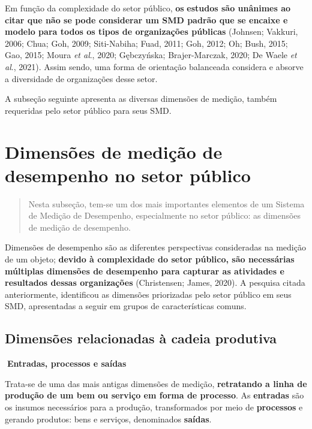 \documentclass[
  letterpaper,
  DIV=11,
  numbers=noendperiod]{scrreprt}
\begin{document}
Em função da complexidade do setor público, \textbf{os} \textbf{estudos
são unânimes ao citar que não se pode considerar um SMD padrão que se
encaixe e modelo para todos os tipos de organizações públicas} (Johnsen;
Vakkuri, 2006; Chua; Goh, 2009; Siti-Nabiha; Fuad, 2011; Goh, 2012; Oh;
Bush, 2015; Gao, 2015; Moura \emph{et al}., 2020; Gębczyńska;
Brajer-Marczak, 2020; De Waele \emph{et al}., 2021). Assim sendo, uma
forma de orientação balanceada considera e absorve a diversidade de
organizações desse setor.

A subseção seguinte apresenta as diversas dimensões de medição, também
requeridas pelo setor público para seus SMD.

\hypertarget{dimensuxf5es-de-mediuxe7uxe3o-de-desempenho-no-setor-puxfablico}{%
\chapter{Dimensões de medição de desempenho no setor
público}\label{dimensuxf5es-de-mediuxe7uxe3o-de-desempenho-no-setor-puxfablico}}

\begin{quote}
Nesta subseção, tem-se um dos mais importantes elementos de um Sistema
de Medição de Desempenho, especialmente no setor público: as dimensões
de medição de desempenho.
\end{quote}

Dimensões de desempenho são as diferentes perspectivas consideradas na
medição de um objeto; \textbf{devido à complexidade do setor público,
são necessárias múltiplas dimensões de desempenho para capturar as
atividades e resultados dessas organizações} (Christensen; James, 2020).
A pesquisa citada anteriormente, identificou as dimensões priorizadas
pelo setor público em seus SMD, apresentadas a seguir em grupos de
características comuns.

\hypertarget{dimensuxf5es-relacionadas-uxe0-cadeia-produtiva}{%
\section{Dimensões relacionadas à cadeia
produtiva}\label{dimensuxf5es-relacionadas-uxe0-cadeia-produtiva}}

\begin{tcolorbox}[enhanced jigsaw, bottomrule=.15mm, arc=.35mm, breakable, toprule=.15mm, rightrule=.15mm, opacityback=0, left=2mm, colback=white, leftrule=.75mm]

\textbf{🔽{Entradas, processos e saídas}}\vspace{2mm}

Trata-se de uma das mais antigas dimensões de medição,
\textbf{retratando a linha de produção de um bem ou serviço em forma de
processo}. As \textbf{entradas} são os insumos necessários para a
produção, transformados por meio de \textbf{processos} e gerando
produtos: bens e serviços, denominados \textbf{saídas}.

\end{tcolorbox}
\end{document}
